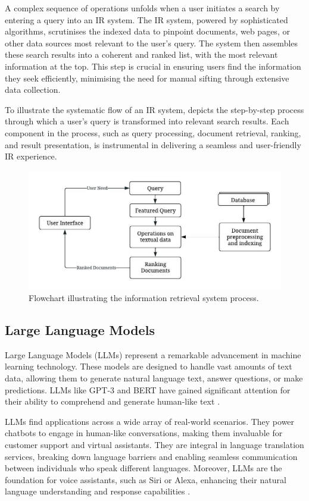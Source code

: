 A complex sequence of operations unfolds when a user initiates a search by entering a query into an IR system. The IR system, powered by sophisticated algorithms, scrutinises the indexed data to pinpoint documents, web pages, or other data sources most relevant to the user's query. The system then assembles these search results into a coherent and ranked list, with the most relevant information at the top. This step is crucial in ensuring users find the information they seek efficiently, minimising the need for manual sifting through extensive data collection.

To illustrate the systematic flow of an IR system,  depicts the step-by-step process through which a user's query is transformed into relevant search results. Each component in the process, such as query processing, document retrieval, ranking, and result presentation, is instrumental in delivering a seamless and user-friendly IR experience.

\begin{figure}
    \centering
    \includegraphics[width=\textwidth]{2Background/IR.jpeg}
    \caption{Flowchart illustrating the information retrieval system process.}
    \label{fig:pipelines}
\end{figure}

\subsection{Large Language Models}
Large Language Models (LLMs) represent a remarkable advancement in machine learning technology. These models are designed to handle vast amounts of text data, allowing them to generate natural language text, answer questions, or make predictions. LLMs like GPT-3 and BERT have gained significant attention for their ability to comprehend and generate human-like text \cite{bert, gpt}.

LLMs find applications across a wide array of real-world scenarios. They power chatbots to engage in human-like conversations, making them invaluable for customer support and virtual assistants. They are integral in language translation services, breaking down language barriers and enabling seamless communication between individuals who speak different languages. Moreover, LLMs are the foundation for voice assistants, such as Siri or Alexa, enhancing their natural language understanding and response capabilities \cite{alexa}.

